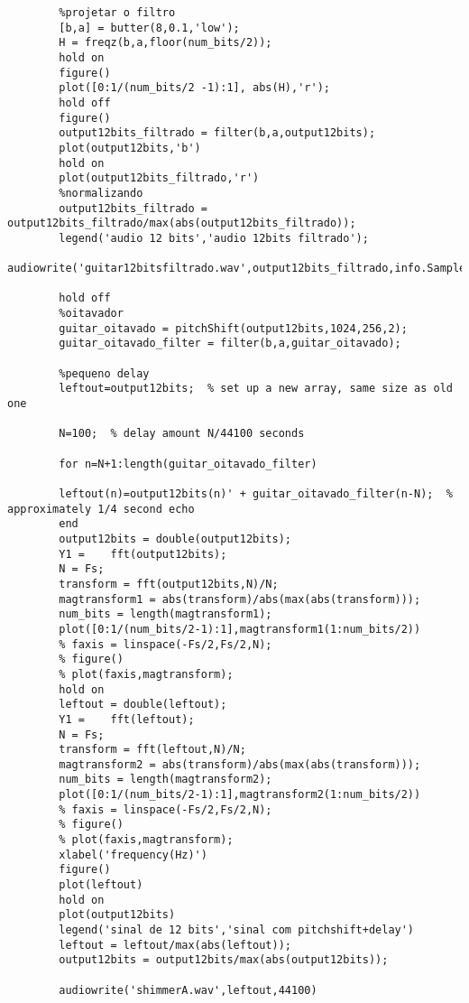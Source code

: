 \begin{lstlisting}
		%projetar o filtro
		[b,a] = butter(8,0.1,'low');
		H = freqz(b,a,floor(num_bits/2));
		hold on
		figure()
		plot([0:1/(num_bits/2 -1):1], abs(H),'r');
		hold off
		figure()
		output12bits_filtrado = filter(b,a,output12bits);
		plot(output12bits,'b')
		hold on
		plot(output12bits_filtrado,'r')
		%normalizando
		output12bits_filtrado = output12bits_filtrado/max(abs(output12bits_filtrado));
		legend('audio 12 bits','audio 12bits filtrado');
		audiowrite('guitar12bitsfiltrado.wav',output12bits_filtrado,info.SampleRate);
		
		hold off
		%oitavador
		guitar_oitavado = pitchShift(output12bits,1024,256,2);
		guitar_oitavado_filter = filter(b,a,guitar_oitavado);
		
		%pequeno delay
		leftout=output12bits;  % set up a new array, same size as old one
		
		N=100;  % delay amount N/44100 seconds
		
		for n=N+1:length(guitar_oitavado_filter)
		
		leftout(n)=output12bits(n)' + guitar_oitavado_filter(n-N);  % approximately 1/4 second echo
		end
		output12bits = double(output12bits);
		Y1 =    fft(output12bits);
		N = Fs;
		transform = fft(output12bits,N)/N;
		magtransform1 = abs(transform)/abs(max(abs(transform)));
		num_bits = length(magtransform1);
		plot([0:1/(num_bits/2-1):1],magtransform1(1:num_bits/2))
		% faxis = linspace(-Fs/2,Fs/2,N);
		% figure()
		% plot(faxis,magtransform);
		hold on
		leftout = double(leftout);
		Y1 =    fft(leftout);
		N = Fs;
		transform = fft(leftout,N)/N;
		magtransform2 = abs(transform)/abs(max(abs(transform)));
		num_bits = length(magtransform2);
		plot([0:1/(num_bits/2-1):1],magtransform2(1:num_bits/2))
		% faxis = linspace(-Fs/2,Fs/2,N);
		% figure()
		% plot(faxis,magtransform);
		xlabel('frequency(Hz)')
		figure()
		plot(leftout)
		hold on
		plot(output12bits)
		legend('sinal de 12 bits','sinal com pitchshift+delay')
		leftout = leftout/max(abs(leftout));
		output12bits = output12bits/max(abs(output12bits));
		
		audiowrite('shimmerA.wav',leftout,44100)
	\end{lstlisting}
	

